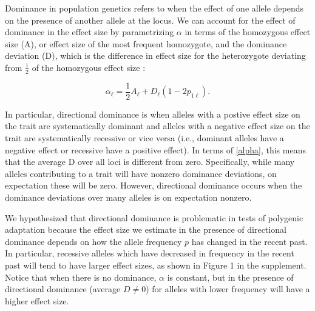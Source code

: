 \documentclass[a4paper,12pt]{article}
\begin{document}

Dominance in population genetics refers to when the effect of one
allele depends on the presence of another allele at the locus. We can account for
the effect of dominance in the effect size by parametrizing $\alpha$
in terms of the homozygous effect size (A), or effect size of the most frequent homozygote, and the
dominance deviation (D), which is the difference in effect size for the heterozygote
deviating from $\frac{1}{2}$ of the homozygous effect size \cite{gillespie}:

\begin{equation}  
  \alpha_\ell = \frac{1}{2} A_\ell + D_\ell\left(1-2p_{1\ell}\right).
  \label{alpha}
\end{equation}

In particular, directional dominance is when alleles with a postive effect
size on the trait are systematically dominant and alleles with a
negative effect size on the trait are systematically recessive or vice
versa (i.e., dominant alleles have a negative effect or recessive have
a positive effect). In terms of \eqref{alpha}, this means that the
average D over all loci is different from zero. Specifically, while
many alleles contributing to a trait will have nonzero dominance
deviations, on expectation these will be zero. However, directional
dominance occurs when the dominance deviations over many alleles is on
expectation nonzero.

We hypothesized that directional dominance is problematic in tests of polygenic adaptation
because the effect size we estimate in the presence of directional
dominance depends on how the allele frequency $p$ has changed in the
recent past. In particular, recessive alleles which have decreased in frequency
in the recent past will tend to have larger effect sizes, as shown in
Figure 1 in the supplement. Notice that when there is no dominance,
$\alpha$ is constant, but in the presence of directional dominance
(average $D\neq0$) for alleles with lower frequency will have a higher
effect size. 
\end{document}
